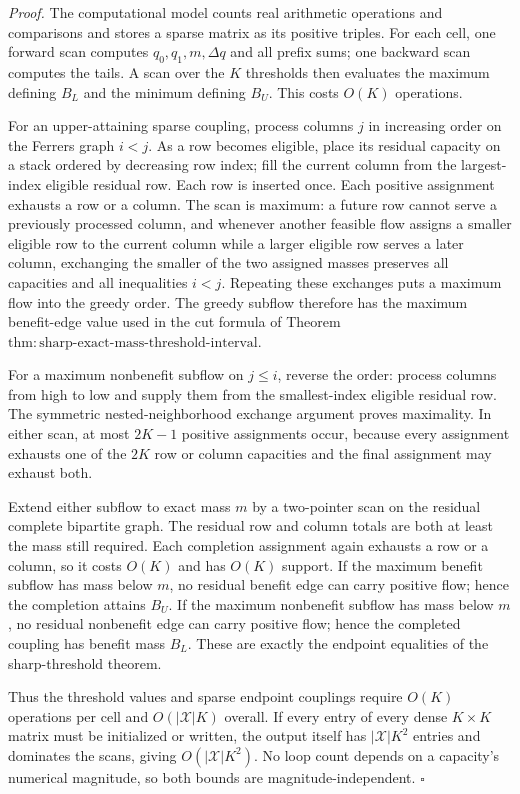 \noindent\textit{Proof.}
The computational model counts real arithmetic operations and
comparisons and stores a sparse matrix as its positive triples.  For each
cell, one forward scan computes \(q_0,q_1,m,\Delta q\) and all prefix
sums; one backward scan computes the tails.  A scan over the \(K\)
thresholds then evaluates the maximum defining \(B_L\) and the minimum
defining \(B_U\).  This costs \(O(K)\) operations.

For an upper-attaining sparse coupling, process columns \(j\) in
increasing order on the Ferrers graph \(i<j\).  As a row becomes eligible,
place its residual capacity on a stack ordered by decreasing row index;
fill the current column from the largest-index eligible residual row.
Each row is inserted once.  Each positive assignment exhausts a row or a
column.  The scan is maximum: a future row cannot serve a previously
processed column, and whenever another feasible flow assigns a smaller
eligible row to the current column while a larger eligible row serves a
later column, exchanging the smaller of the two assigned masses preserves
all capacities and all inequalities \(i<j\).  Repeating these exchanges
puts a maximum flow into the greedy order.  The greedy subflow therefore
has the maximum benefit-edge value used in the cut formula of Theorem
\(\mathrm{thm{:}sharp\text{-}exact\text{-}mass\text{-}threshold\text{-}interval}\).

For a maximum nonbenefit subflow on \(j\le i\), reverse the order: process
columns from high to low and supply them from the smallest-index eligible
residual row.  The symmetric nested-neighborhood exchange argument proves
maximality.  In either scan, at most \(2K-1\) positive assignments occur,
because every assignment exhausts one of the \(2K\) row or column
capacities and the final assignment may exhaust both.

Extend either subflow to exact mass \(m\) by a two-pointer scan on the
residual complete bipartite graph.  The residual row and column totals are
both at least the mass still required.  Each completion assignment again
exhausts a row or a column, so it costs \(O(K)\) and has \(O(K)\) support.
If the maximum benefit subflow has mass below \(m\), no residual benefit
edge can carry positive flow; hence the completion attains \(B_U\).  If
the maximum nonbenefit subflow has mass below \(m\), no residual
nonbenefit edge can carry positive flow; hence the completed coupling has
benefit mass \(B_L\).  These are exactly the endpoint equalities of the
sharp-threshold theorem.

Thus the threshold values and sparse endpoint couplings require
\(O(K)\) operations per cell and \(O(|\mathcal X|K)\) overall.  If every
entry of every dense \(K\times K\) matrix must be initialized or written,
the output itself has \(|\mathcal X|K^2\) entries and dominates the scans,
giving \(O(|\mathcal X|K^2)\).  No loop count depends on a capacity's
numerical magnitude, so both bounds are magnitude-independent. \(\square\)